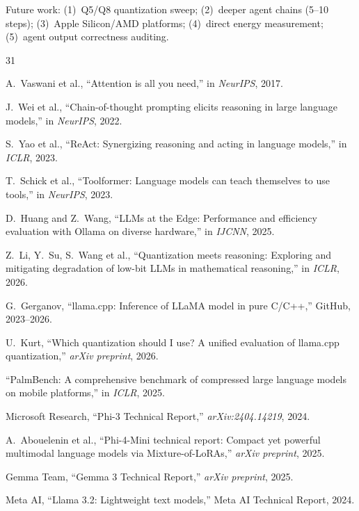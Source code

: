 \documentclass[conference]{IEEEtran}
\begin{document}
Future work: (1)~Q5/Q8 quantization sweep; (2)~deeper agent chains (5--10 steps); (3)~Apple Silicon/AMD platforms; (4)~direct energy measurement; (5)~agent output correctness auditing.



\begin{thebibliography}{31}

A.~Vaswani et al., ``Attention is all you need,'' in \emph{NeurIPS}, 2017.

J.~Wei et al., ``Chain-of-thought prompting elicits reasoning in large language models,'' in \emph{NeurIPS}, 2022.

S.~Yao et al., ``ReAct: Synergizing reasoning and acting in language models,'' in \emph{ICLR}, 2023.

T.~Schick et al., ``Toolformer: Language models can teach themselves to use tools,'' in \emph{NeurIPS}, 2023.

D.~Huang and Z.~Wang, ``LLMs at the Edge: Performance and efficiency evaluation with Ollama on diverse hardware,'' in \emph{IJCNN}, 2025.

Z.~Li, Y.~Su, S.~Wang et al., ``Quantization meets reasoning: Exploring and mitigating degradation of low-bit LLMs in mathematical reasoning,'' in \emph{ICLR}, 2026.

G.~Gerganov, ``llama.cpp: Inference of LLaMA model in pure C/C++,'' GitHub, 2023--2026.

U.~Kurt, ``Which quantization should I use? A unified evaluation of llama.cpp quantization,'' \emph{arXiv preprint}, 2026.

``PalmBench: A comprehensive benchmark of compressed large language models on mobile platforms,'' in \emph{ICLR}, 2025.

Microsoft Research, ``Phi-3 Technical Report,'' \emph{arXiv:2404.14219}, 2024.

A.~Abouelenin et al., ``Phi-4-Mini technical report: Compact yet powerful multimodal language models via Mixture-of-LoRAs,'' \emph{arXiv preprint}, 2025.

Gemma Team, ``Gemma 3 Technical Report,'' \emph{arXiv preprint}, 2025.

Meta AI, ``Llama 3.2: Lightweight text models,'' Meta AI Technical Report, 2024.


\end{thebibliography}
\end{document}
